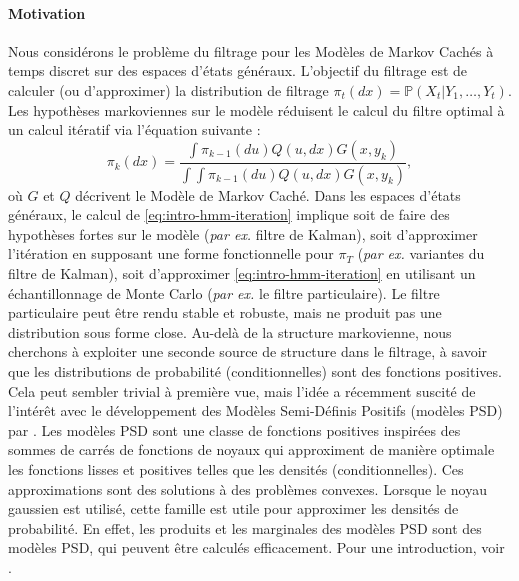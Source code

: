 \paragraph{Motivation}
Nous considérons le problème du filtrage pour les Modèles de Markov Cachés à temps discret sur des espaces d'états généraux. L'objectif du filtrage est de calculer (ou d'approximer) la distribution de filtrage $\pi_t(dx) = \mathbb P(X_t\vert Y_1, \ldots, Y_{t})$. Les hypothèses markoviennes sur le modèle réduisent le calcul du filtre optimal à un calcul itératif via l'équation suivante :
\begin{equation}
\pi_k(dx) = \frac{\int \pi_{k-1}(du)Q(u, dx)G(x, y_k)}{\int \int \pi_{k-1}(du)Q(u, dx)G(x, y_k)},
\end{equation}
où $G$ et $Q$ décrivent le Modèle de Markov Caché.
Dans les espaces d'états généraux, le calcul de \cref{eq:intro-hmm-iteration} implique soit de faire des hypothèses fortes sur le modèle (\emph{par ex.} filtre de Kalman), soit d'approximer l'itération en supposant une forme fonctionnelle pour $\pi_T$ (\emph{par ex.} variantes du filtre de Kalman), soit d'approximer \cref{eq:intro-hmm-iteration} en utilisant un échantillonnage de Monte Carlo (\emph{par ex.} le filtre particulaire). Le filtre particulaire peut être rendu stable et robuste, mais ne produit pas une distribution sous forme close.
Au-delà de la structure markovienne, nous cherchons à exploiter une seconde source de structure dans le filtrage, à savoir que les distributions de probabilité (conditionnelles) sont des fonctions positives. Cela peut sembler trivial à première vue, mais l'idée a récemment suscité de l'intérêt avec le développement des Modèles Semi-Définis Positifs (modèles PSD) par \citet{ulysse-non-negative}. Les modèles PSD sont une classe de fonctions positives inspirées des sommes de carrés de fonctions de noyaux qui approximent de manière optimale les fonctions lisses et positives telles que les densités (conditionnelles). Ces approximations sont des solutions à des problèmes convexes. Lorsque le noyau gaussien est utilisé, cette famille est utile pour approximer les densités de probabilité. En effet, les produits et les marginales des modèles PSD sont des modèles PSD, qui peuvent être calculés efficacement. Pour une introduction, voir \citet{rudi2021psd,sampling-ulysse}.
